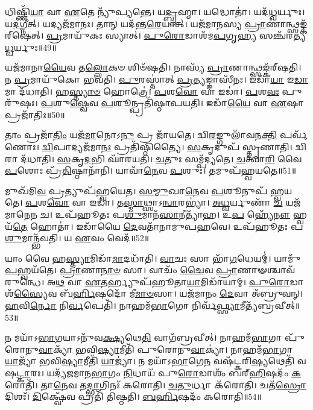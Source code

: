 𑌧𑌿𑌷𑍍𑌣𑌿᳴\-\ul{𑌯𑌾} 𑌵𑌾 \ul{𑌏}\-𑌤𑍇 𑌨𑍍𑌯𑍁᳴𑌪𑍍𑌯𑌨𑍍𑌤𑍇।
𑌯\-\ul{𑌦𑍍𑌬𑍍𑌰}\-𑌹𑍍𑌮𑌾।
𑌯𑌦𑍍𑌧𑍋𑌤𑌾॑।
𑌯𑌦᳴\-\ul{𑌧𑍍𑌵}\-𑌰𑍍𑌯𑍁𑌃।
𑌯\-\ul{𑌦}\-𑌗𑍍𑌨𑍀𑌤𑍍।
𑌯𑌦𑍍𑌯𑌜᳴𑌮𑌾𑌨𑌃।
𑌤𑌾𑌨𑍍 𑌯𑌦᳴𑌨𑍍𑌤\-\ul{𑌰𑍇}\-𑌯𑌾𑌤𑍍।
𑌯𑌜᳴𑌮𑌾𑌨𑌸𑍍𑌯 \ul{𑌪𑍍𑌰𑌾}\-𑌣𑌾𑌨𑍍𑌥𑍍𑌸𑌙𑍍𑌕᳴𑌰𑍍‌\mbox{}𑌷𑍇𑌤𑍍।
\-\ul{𑌪𑍍𑌰}\-𑌮𑌾𑌯𑍁᳴𑌕𑌃 𑌸𑍍𑌯𑌾𑌤𑍍।
\-\ul{𑌪𑍁}\-\-\ul{𑌰𑍋}\-𑌡𑌾𑌶᳴𑌮\-\ul{𑌪}\-𑌗𑍃\-\ul{𑌹𑍍𑌯} 𑌸𑌞𑍍𑌚᳴𑌰\-𑌤𑍍𑌯\-\ul{𑌧𑍍𑌵}\-𑌰𑍍𑌯𑍁𑌃॥49॥

𑌯𑌜᳴𑌮𑌾𑌨𑌾\-\ul{𑌯𑍈}\-𑌵 𑌤\-\ul{𑌲𑍍𑌲𑍋}\-𑌕𑍞 𑌶𑌿𑍞᳴𑌷𑌤𑌿।
𑌨𑌾𑌸𑍍𑌯᳴ \ul{𑌪𑍍𑌰𑌾}\-𑌣𑌾𑌨𑍍𑌥𑍍𑌸𑌙𑍍𑌕᳴𑌰𑍍‌\mbox{}\-𑌷𑌤𑌿।
𑌨 \ul{𑌪𑍍𑌰}\-𑌮𑌾𑌯𑍁᳴𑌕𑍋 𑌭𑌵𑌤𑌿।
\-\ul{𑌪𑍁}\-𑌰𑌸𑍍𑌤𑌾॑𑌤𑍍 \ul{𑌪𑍍𑌰}\-𑌤𑍍𑌯𑌙𑍍𑌙𑌾𑌸𑍀᳴𑌨𑌃।
𑌇𑌡𑌾᳴\-\ul{𑌯𑌾} 𑌇\-\ul{𑌡𑌾}\-\-𑌮𑌾 𑌦᳴𑌧𑌾𑌤𑌿।
𑌹\-\ul{𑌸𑍍𑌤𑍍𑌯𑌾}\-\-\ul{𑍞} 𑌹𑍋𑌤𑍍𑌰𑍇॑।
\-\ul{𑌪}\-𑌶\-\ul{𑌵𑍋} 𑌵𑌾 𑌇𑌡𑌾॑।
\-\ul{𑌪}\-𑌶\-\ul{𑌵𑌃} 𑌪𑍁𑌰𑍁᳴𑌷𑌃।
\-\ul{𑌪}\-𑌶𑍁\-\ul{𑌷𑍍𑌵𑍇}\-𑌵 \ul{𑌪}\-𑌶𑍂𑌨𑍍𑌪𑍍𑌰𑌤𑌿᳴\-𑌷𑍍𑌠𑌾𑌪𑌯𑌤𑌿।
𑌇𑌡𑌾᳴\-\ul{𑌯𑍈} 𑌵𑌾 \ul{𑌏}\-𑌷𑌾 𑌪𑍍𑌰𑌜𑌾᳴𑌤𑌿𑌃॥50॥

𑌤𑌾𑌂 𑌪𑍍𑌰𑌜𑌾᳴\-\ul{𑌤𑌿𑌂} 𑌯𑌜᳴\-\ul{𑌮𑌾}\-𑌨𑍋𑌽\-\ul{𑌨𑍁} 𑌪𑍍𑌰 𑌜𑌾᳴𑌯𑌤𑍇।
𑌦𑍍𑌵𑌿\-\ul{𑌰}\-𑌙𑍍𑌗𑍁𑌲𑌾᳴𑌵𑌨\-\ul{𑌕𑍍𑌤𑌿} 𑌪𑌰𑍍𑌵᳴𑌣𑍋𑌃।
\-\ul{𑌦𑍍𑌵𑌿}\-𑌪𑌾𑌦𑍍𑌯𑌜᳴𑌮𑌾\-\ul{𑌨𑌃} 𑌪𑍍𑌰𑌤𑌿᳴\-𑌷𑍍𑌠𑌿𑌤𑍍𑌯𑍈।
\-\ul{𑌸}\-𑌕𑍃𑌦𑍁𑌪᳴ 𑌸𑍍𑌤𑍃𑌣𑌾𑌤𑌿।
𑌦𑍍𑌵𑌿𑌰𑌾 𑌦᳴𑌧𑌾𑌤𑌿।
\-\ul{𑌸}\-𑌕𑍃\-\ul{𑌦}\-𑌭𑌿 𑌘𑌾᳴𑌰𑌯𑌤𑌿।
\-\ul{𑌚}\-𑌤𑍁𑌃 𑌸𑌮𑍍𑌪᳴𑌦𑍍𑌯𑌤𑍇।
\-\ul{𑌚}\-𑌤𑍍𑌵𑌾\-\ul{𑌰𑌿} 𑌵𑍈 \ul{𑌪}\-𑌶𑍋𑌃 𑌪𑍍𑌰᳴\-\ul{𑌤𑌿}\-𑌷𑍍𑌠𑌾𑌨𑌾᳴𑌨𑌿।
𑌯𑌾𑌵𑌾᳴\-\ul{𑌨𑍇}\-𑌵 \ul{𑌪}\-𑌶𑍁𑌃।
𑌤𑌮𑍁𑌪᳴𑌹𑍍𑌵𑌯𑌤𑍇॥51॥

𑌮𑍁𑌖᳴𑌮𑌿\-\ul{𑌵} 𑌪𑍍𑌰𑌤𑍍𑌯𑍁𑌪᳴𑌹𑍍𑌵𑌯𑍇𑌤।
\-\ul{𑌸}\-\-\ul{𑌮𑍍𑌮𑍁}\-𑌖𑌾\-\ul{𑌨𑍇}\-𑌵 \ul{𑌪}\-𑌶𑍂𑌨𑍁𑌪᳴ 𑌹𑍍𑌵𑌯𑌤𑍇।
\-\ul{𑌪}\-𑌶\-\ul{𑌵𑍋} 𑌵𑌾 𑌇𑌡𑌾॑।
𑌤\-\ul{𑌸𑍍𑌮𑌾}\-𑌥𑍍𑌸𑌾\-𑌽\-\ul{𑌨𑍍𑌵𑌾}\-𑌰𑌭𑍍𑌯𑌾॑।
\-\ul{𑌅}\-\-\ul{𑌧𑍍𑌵}\-𑌰𑍍𑌯𑍁𑌣𑌾᳴ \ul{𑌚} 𑌯𑌜᳴𑌮𑌾𑌨𑍇𑌨 𑌚।
𑌉𑌪᳴𑌹𑍂𑌤𑌃 𑌪\-\ul{𑌶𑍁}\-𑌮𑌾𑌨᳴\-\ul{𑌸𑌾}\-𑌨𑍀𑌤𑍍𑌯𑌾᳴𑌹।
𑌉\-\ul{𑌪} 𑌹𑍍𑌯𑍇᳴\-\ul{𑌨𑍗} 𑌹𑍍𑌵𑌯᳴\-\ul{𑌤𑍇} 𑌹𑍋𑌤𑌾॑।
𑌇𑌡𑌾᳴𑌯𑍈 \ul{𑌦𑍇}\-𑌵𑌤𑌾᳴𑌨𑌾𑌮𑍁𑌪\-\ul{𑌹}\-𑌵𑍇।
𑌉𑌪᳴𑌹𑍂𑌤𑌃 𑌪\-\ul{𑌶𑍁}\-𑌮𑌾𑌨𑍍𑌭᳴𑌵𑌤𑌿।
𑌯 \ul{𑌏}\-𑌵𑌂 𑌵𑍇𑌦᳴॥52॥

𑌯𑌾𑌂 𑌵𑍈 𑌹\-\ul{𑌸𑍍𑌤𑍍𑌯𑌾}\-𑌮𑌿𑌡𑌾᳴\-\ul{𑌮𑌾}\-𑌦𑌧𑌾᳴𑌤𑌿।
\-\ul{𑌵𑌾}\-𑌚𑌃 𑌸𑌾 𑌭𑌾᳴\-\ul{𑌗}\-𑌧𑍇𑌯𑌮𑍍॑।
𑌯𑌾𑌮𑍁᳴\-\ul{𑌪}\-𑌹𑍍𑌵𑌯᳴𑌤𑍇।
\-\ul{𑌪𑍍𑌰𑌾}\-𑌣𑌾\-\ul{𑌨𑌾}\-\-\ul{𑍞} 𑌸𑌾।
𑌵𑌾𑌚𑌂᳴ \ul{𑌚𑍈}\-𑌵 \ul{𑌪𑍍𑌰𑌾}\-𑌣𑌾𑍟𑌶𑍍𑌚𑌾𑌵᳴ 𑌰𑍁𑌨𑍍𑌧𑍇।
𑌅\-\ul{𑌥} 𑌵𑌾 \ul{𑌏}\-𑌤𑌰𑍍𑌹𑍍𑌯𑍁𑌪᳴𑌹𑍂𑌤𑌾\-\ul{𑌯𑌾}\-𑌮𑌿𑌡𑌾᳴𑌯𑌾𑌮𑍍।
\-\ul{𑌪𑍁}\-\-\ul{𑌰𑍋}\-𑌡𑌾𑌶᳴\-\ul{𑌸𑍍𑌯𑍈}\-𑌵 𑌬᳴\-\ul{𑌰𑍍𑌹𑌿}\-𑌷𑌦𑍋᳴ 𑌮𑍀\-\ul{𑌮𑌾}\-\-\ul{𑍞}\-𑌸𑌾।
𑌯𑌜᳴𑌮𑌾𑌨𑌂 \ul{𑌦𑍇}\-𑌵𑌾 𑌅᳴𑌬𑍍𑌰𑍁𑌵𑌨𑍍।
\-\ul{𑌹}\-𑌵𑌿\-\ul{𑌰𑍍𑌨𑍋} 𑌨𑌿\-\ul{𑌰𑍍𑌵}\-𑌪𑍇𑌤𑌿᳴।
𑌨𑌾𑌹𑌮᳴\-\ul{𑌭𑌾}\-𑌗𑍋 𑌨𑌿𑌰𑍍𑌵᳴\-\ul{𑌫𑍍𑌸𑍍𑌯𑌾}\-𑌮𑍀𑌤𑍍𑌯᳴𑌬𑍍𑌰𑌵𑍀𑌤𑍍॥53॥

𑌨 𑌮𑌯𑌾᳴\-𑌽\-\ul{𑌭𑌾}\-𑌗𑌯𑌾\-𑌽𑌨𑍁᳴𑌵\-\ul{𑌕𑍍𑌷𑍍𑌯}\-𑌥𑍇\-\ul{𑌤𑌿} 𑌵𑌾𑌗᳴𑌬𑍍𑌰𑌵𑍀𑌤𑍍।
𑌨𑌾𑌹𑌮᳴\-\ul{𑌭𑌾}\-𑌗𑌾 𑌪𑍁᳴𑌰𑍋𑌨𑍁\-\ul{𑌵𑌾}\-𑌕𑍍𑌯𑌾᳴ 𑌭𑌵𑌿\-\ul{𑌷𑍍𑌯𑌾}\-𑌮𑍀𑌤𑌿᳴ 𑌪𑍁𑌰𑍋𑌨𑍁\-\ul{𑌵𑌾}\-𑌕𑍍𑌯𑌾॑।
𑌨𑌾𑌹𑌮᳴\-\ul{𑌭𑌾}\-𑌗𑌾 \ul{𑌯𑌾}\-𑌜𑍍𑌯𑌾᳴ 𑌭𑌵𑌿\-\ul{𑌷𑍍𑌯𑌾}\-𑌮𑍀𑌤𑌿᳴ \ul{𑌯𑌾}\-𑌜𑍍𑌯𑌾॑।
𑌨 𑌮𑌯𑌾᳴\-𑌽\-\ul{𑌭𑌾}\-𑌗𑍇\-\ul{𑌨} 𑌵𑌷᳴𑌟𑍍𑌕𑌰𑌿\-\ul{𑌷𑍍𑌯}\-𑌥𑍇𑌤𑌿᳴ 𑌵𑌷\-\ul{𑌟𑍍𑌕𑌾}\-𑌰𑌃।
𑌯𑌦𑍍𑌯᳴𑌜𑌮𑌾𑌨\-\ul{𑌭𑌾}\-𑌗𑌂 \ul{𑌨𑌿}\-𑌧𑌾𑌯᳴ 𑌪𑍁\-\ul{𑌰𑍋}\-𑌡𑌾𑌶𑌂᳴ 𑌬𑌰𑍍‌\mbox{}\-\ul{𑌹𑌿}\-𑌷𑌦𑌂᳴ \ul{𑌕}\-𑌰𑍋𑌤𑌿᳴।
𑌤𑌾\-\ul{𑌨𑍇}\-𑌵 𑌤\-\ul{𑌦𑍍𑌭𑌾}\-𑌗𑌿𑌨𑌃᳴ 𑌕𑌰𑍋𑌤𑌿।
\-\ul{𑌚}\-\-\ul{𑌤𑍁}\-𑌰𑍍𑌧𑌾 𑌕᳴𑌰𑍋𑌤𑌿।
𑌚𑌤᳴\-\ul{𑌸𑍍𑌰𑍋} 𑌦𑌿𑌶𑌃᳴।
\-\ul{𑌦𑌿}\-𑌕𑍍𑌷𑍍𑌵𑍇᳴𑌵 𑌪𑍍𑌰𑌤𑌿᳴ 𑌤𑌿𑌷𑍍𑌠𑌤𑌿।
\-\ul{𑌬}\-\-\ul{𑌰𑍍}\-\-\ul{𑌹𑌿}\-𑌷𑌦𑌂᳴ 𑌕𑌰𑍋𑌤𑌿॥54॥

